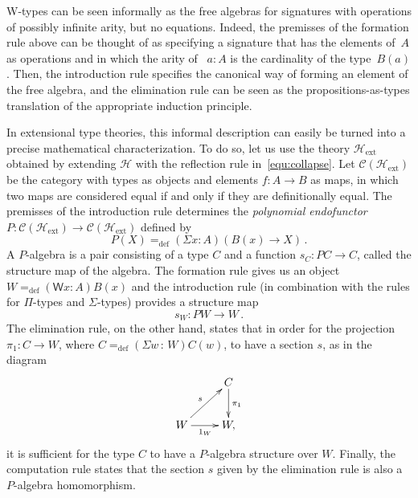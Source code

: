 \documentclass{article}
\newcommand{\defeq}{=_{\mathrm{def}}}
\newcommand{\W}{\mathsf{W}}
\newcommand{\Hint}{\mathcal{H}}
\newcommand{\Hext}{\mathcal{H}_{\mathrm{ext}}}
\theoremstyle{remark}
\theoremstyle{definition}
\begin{document}
W-types can be seen informally as the free algebras for signatures
with operations of possibly infinite arity, but no equations. Indeed, the premisses 
of the formation rule above can be thought of as specifying a signature that has the elements of~$A$ 
as operations and in which the arity of~ $a : A$ is the cardinality of the type~$B(a)$. Then, the introduction rule specifies the canonical way of forming an element of the free algebra, and the elimination rule can be seen as the propositions-as-types translation of the appropriate induction principle.

In extensional type theories, this informal description can easily be turned into a precise
mathematical characterization. To do so, let us use the theory $\Hext$ obtained
by extending $\Hint$ with the reflection rule in~\eqref{equ:collapse}. Let $\mathcal{C}(\Hext)$ be the category with
types as objects and elements $f : A \rightarrow B$ as maps, in which two maps are
considered equal if and only if they are definitionally equal. The premisses of the introduction
rule determines the \emph{polynomial endofunctor} $P : \mathcal{C}(\Hext) \rightarrow \mathcal{C}(\Hext)$
defined by 
\[
    P(X) \defeq (\Sigma x : A ) (B(x) \rightarrow X) \, .
\]
A $P$-algebra is a pair consisting of a type $C$ and a function $s_C : PC \rightarrow C$, called 
the structure map of the algebra. The formation rule gives us an object $W \defeq (\W x : A)
B(x)$ and the introduction rule (in combination with the rules for $\Pi$-types
and $\Sigma$-types) provides a structure map
\[
s_W : PW \rightarrow W \, .
\]
The elimination rule, on the other hand, states that in order for the projection $\pi_1 \colon C \rightarrow W$, where
$C \defeq (\Sigma w {\, : \, } W) C(w)$, to have a section $s$, as in the diagram
\[
\xymatrix{
& C  \ar[d]^{\pi_1} \\
W \ar[ru]^{s} \ar[r]_{1_W} & W, 
}
\]
it is sufficient for the type $C$ to have a $P$-algebra structure over $W$. Finally, the computation rule states that the section $s$ given by the elimination rule is also a $P$-algebra homomorphism. 
\end{document}
